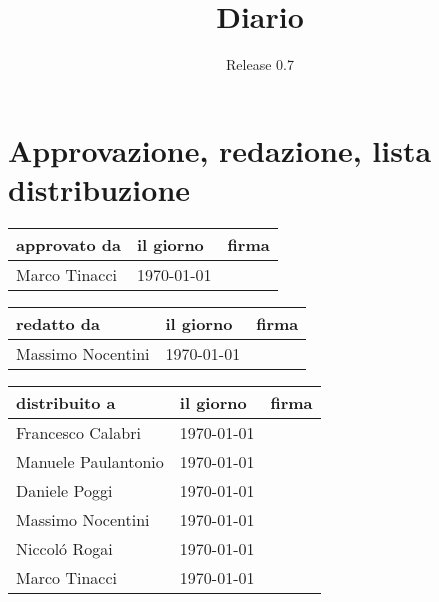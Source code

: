 \documentclass[a4paper, 12pt]{report}
\title{Diario}
\author{Release 0.7}
\date{\today \\Firenze \\\begin{figure}[h] \centering \texttt{[image: ../images/logokiwi.png]} \end{figure} }
\begin{document}
\maketitle

\section*{Approvazione, redazione, lista distribuzione}
\begin{table}[h!]
  \begin{center}
    \begin{tabular}{| l | l | p{60mm} |}
    \hline
    \textbf{approvato da} & \textbf{il giorno} & \textbf{firma} \\
	\hline    
	Marco Tinacci & \today &  \\
    \hline
    \end{tabular}
  \end{center}
\end{table}

\begin{table}[h!]
  \begin{center}
    \begin{tabular}{| l | l | p{60mm} |}
    \hline
    \textbf{redatto da} & \textbf{il giorno} & \textbf{firma} \\
	\hline    
	Massimo Nocentini & \today &  \\
    \hline
    \end{tabular}
  \end{center}
\end{table}

\begin{table}[h!]
  \begin{center}
    \begin{tabular}{| l | l | p{60mm} |}
    \hline
    \textbf{distribuito a} & \textbf{il giorno} & \textbf{firma} \\
	\hline    
	Francesco Calabri & \today &  \\
    \hline
	Manuele Paulantonio & \today &  \\
    \hline
	Daniele Poggi & \today &  \\
    \hline
	Massimo Nocentini & \today &  \\
    \hline
	Niccol\'o Rogai & \today &  \\
    \hline
	Marco Tinacci & \today &  \\
    \hline
    \end{tabular}
  \end{center}
\end{table}
\end{document}
